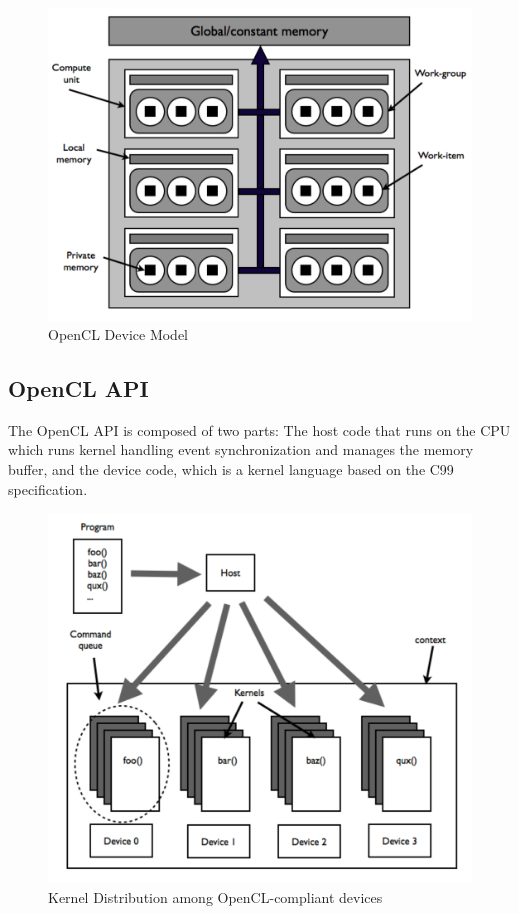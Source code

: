 \begin{figure}[H]
\caption{OpenCL Device Model\cite{OpenCLInAction}}
\centering
\includegraphics[scale=0.5]{OpenCL_Device_Model.pdf}
\end{figure}

\subsection{OpenCL API}

The \gls{OpenCL} \gls{API} is composed of two parts: The host code that runs on the CPU which runs kernel handling event synchronization and manages the memory buffer, and the device code, which is a kernel language based on the C99 specification.

\begin{figure}[H]
\caption{Kernel Distribution among OpenCL-compliant devices\cite{OpenCLInAction}}
\centering
\includegraphics[scale=0.5]{OpenCL_Objects.pdf}
\end{figure}

